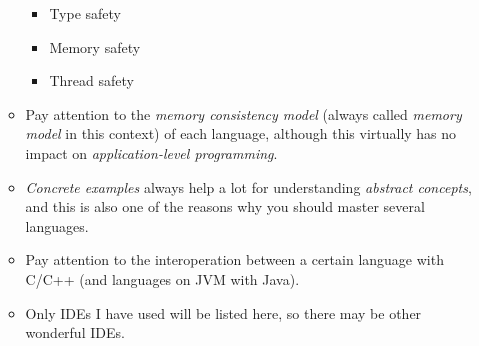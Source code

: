 \documentclass{article}
\begin{document}
\begin{itemize}
\begin{itemize}
            \begin{itemize}
                \item Type safety
                \item Memory safety
                \item Thread safety
            \end{itemize}
            \item Pay attention to the \emph{memory consistency model} (always called \emph{memory model} in this context) of each language, although this virtually has no impact on \emph{application-level programming}.
            \item \emph{Concrete examples} always help a lot for understanding \emph{abstract concepts}, and this is also one of the reasons why you should master several languages.
            \item Pay attention to the interoperation between a certain language with C/C++ (and languages on JVM with Java).
            \item Only IDEs I have used will be listed here, so there may be other wonderful IDEs.
        \end{itemize}
\end{itemize}
\end{document}
